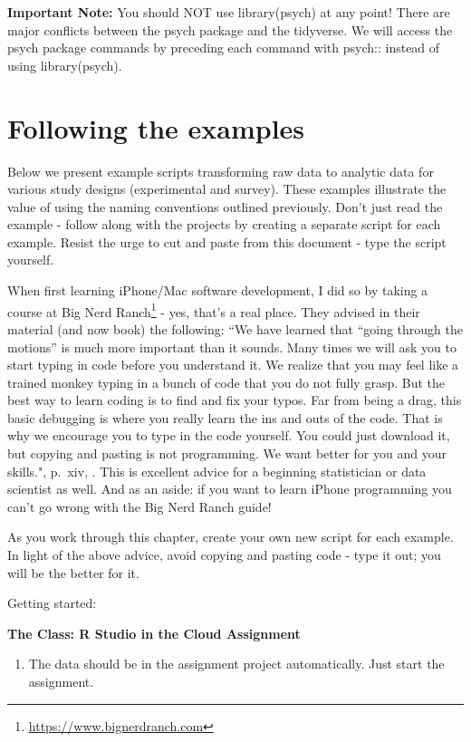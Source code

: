 \documentclass[
]{krantz}
\providecommand{\tightlist}{%
  \setlength{\itemsep}{0pt}\setlength{\parskip}{0pt}}
\renewcommand{\href}[2]{#2\footnote{\url{#1}}}
\begin{document}
\textbf{Important Note:} You should NOT use library(psych) at any point! There are major conflicts between the psych package and the tidyverse. We will access the psych package commands by preceding each command with psych:: instead of using library(psych).

\hypertarget{following-the-examples}{%
\section{Following the examples}\label{following-the-examples}}

Below we present example scripts transforming raw data to analytic data for various study designs (experimental and survey). These examples illustrate the value of using the naming conventions outlined previously. Don't just read the example - follow along with the projects by creating a separate script for each example. Resist the urge to cut and paste from this document - type the script yourself.

When first learning iPhone/Mac software development, I did so by taking a course at \href{https://www.bignerdranch.com}{Big Nerd Ranch} - yes, that's a real place. They advised in their material (and now book) the following: ``We have learned that ``going through the motions'' is much more important than it sounds. Many times we will ask you to start typing in code before you understand it. We realize that you may feel like a trained monkey typing in a bunch of code that you do not fully grasp. But the best way to learn coding is to find and fix your typos. Far from being a drag, this basic debugging is where you really learn the ins and outs of the code. That is why we encourage you to type in the code yourself. You could just download it, but copying and pasting is not programming. We want better for you and your skills.", p.~xiv, \citep{keur2020}. This is excellent advice for a beginning statistician or data scientist as well. And as an aside: if you want to learn iPhone programming you can't go wrong with the Big Nerd Ranch guide!

As you work through this chapter, create your own new script for each example. In light of the above advice, avoid copying and pasting code - type it out; you will be the better for it.

Getting started:

\textbf{The Class: R Studio in the Cloud Assignment}

\begin{enumerate}
\def\labelenumi{\arabic{enumi}.}
\tightlist
\item
  The data should be in the assignment project automatically. Just start the assignment.
\end{enumerate}
\end{document}
